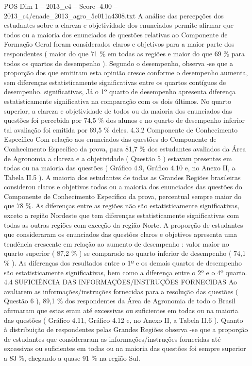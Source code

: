 \begin{textsample}{POS Dim 1 – 2013\_c4 – Score -4.00 – 2013\_c4/enade\_2013\_agro\_5c011a4308.txt}
A análise das percepções dos estudantes sobre a clareza e objetividade dos enunciados permite afirmar que todos ou a maioria dos enunciados de questões relativas ao Componente de Formação Geral foram considerados claros e objetivos para a maior parte dos respondentes ( maior do que 71 \% em todas as regiões e maior do que 69 \% para todos os quartos de desempenho ).
Segundo o desempenho, observa -se que a proporção dos que emitiram esta opinião cresce conforme o desempenho aumenta, sem diferenças estatisticamente significativas entre os quartos contíguos de desempenho. significativas, Já o 1º quarto de desempenho apresenta diferença estatisticamente significativa na comparação com os dois últimos.
No quarto superior, a clareza e objetividade de todos ou da maioria dos enunciados das questões foi percebida por 74,5 \% dos alunos e no quarto de desempenho inferior tal avaliação foi emitida por 69,5 \% deles. 4.3.2 Componente de Conhecimento Específico Com relação aos enunciados das questões do Componente de Conhecimento Específico da prova, para 81,7 \% dos estudantes avaliados da Área de Agronomia a clareza e a objetividade ( Questão 5 ) estavam presentes em todas ou na maioria das questões ( Gráfico 4.9, Gráfico 4.10 e, no Anexo II, a Tabela II.5 ).
A maioria dos estudantes de todas as Grandes Regiões brasileiras considerou claros e objetivos todos ou a maioria dos enunciados das questões do Componente de Conhecimento Específico da prova, percentual sempre maior do que 78 \%.
As diferenças entre as regiões não são estatisticamente significativas, exceto a região Nordeste que tem diferenças estatisticamente significativas com todas as outras regiões com exceção da região Norte.
A proporção de estudantes que consideraram os enunciados das questões claros e objetivos apresenta uma tendência crescente em relação ao aumento de desempenho : valor maior no quarto superior ( 87,2 \% ) se comparado ao quarto inferior de desempenho ( 74,1 \% ).
As diferenças dos resultados entre o 1º e os demais quartos de desempenho são estatisticamente significativas, bem como a diferença entre o 2º e o 4º quarto. 4.4 SUFICIÊNCIA DAS INFORMAÇÕES/INSTRUÇÕES FORNECIDAS Ao avaliarem as informações/instruções fornecidas para a resolução das questões ( Questão 6 ), 89,1 \% dos respondentes da Área de Agronomia de todo o Brasil afirmaram que estas eram até excessivas ou suficientes em todas ou na maioria das questões ( Gráfico 4.11, Gráfico 4.12 e, no Anexo II, a Tabela II.6 ).
Quanto à distribuição de respondentes pelas Grandes Regiões observa -se que a proporção de estudantes que consideraram as informações/instruções fornecidas até excessivas ou suficientes em todas ou na maioria das questões foi sempre superior a 83 \%, chegando a quase 91 \% na região Sul.

\end{textsample}
